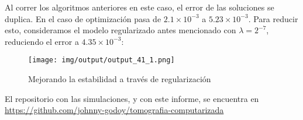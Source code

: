 Al correr los algoritmos anteriores en este caso, el error de las soluciones se duplica. En el caso de optimización pasa de $2.1\times 10^{-3}$ a $5.23\times 10^{-3}$. Para reducir esto, consideramos el modelo regularizado antes mencionado con $\lambda=2^{-7}$, reduciendo el error a $4.35\times 10^{-3}$:

\begin{figure}
    \centering
    \texttt{[image: img/output/output\_41\_1.png]}
    \caption{Mejorando la estabilidad a través de regularización}
    \label{fig:my_label}
\end{figure}


El repositorio con las simulaciones, y con este informe, se encuentra en \href{https://github.com/johnny-godoy/tomografia-computarizada}{https://github.com/johnny-godoy/tomografia-computarizada}

 